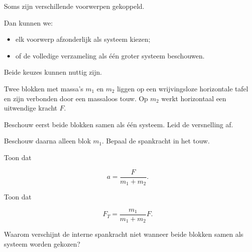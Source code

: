 \documentclass{ximera}
\begin{document}


Soms zijn verschillende voorwerpen gekoppeld.

Dan kunnen we:

\begin{itemize}
  \item elk voorwerp afzonderlijk als systeem kiezen;
  \item of de volledige verzameling als één groter systeem beschouwen.
\end{itemize}

Beide keuzes kunnen nuttig zijn.


\begin{oefening}{\oefU\ESS}

Twee blokken met massa's $m_1$ en $m_2$ liggen op een wrijvingsloze
horizontale tafel en zijn verbonden door een massaloos touw. Op
$m_2$ werkt horizontaal een uitwendige kracht $F$.

\begin{question}
Beschouw eerst beide blokken samen als één systeem. Leid de versnelling
af.
\end{question}

\begin{question}
Beschouw daarna alleen blok $m_1$. Bepaal de spankracht in het touw.
\end{question}

\begin{question}
Toon dat

\[
a=\frac{F}{m_1+m_2}.
\]

\end{question}

\begin{question}
Toon dat

\[
F_T=\frac{m_1}{m_1+m_2}F.
\]

\end{question}

\begin{question}
Waarom verschijnt de interne spankracht niet wanneer beide blokken samen
als systeem worden gekozen?
\end{question}

\end{oefening}


\end{document}
